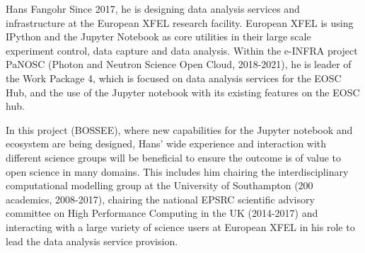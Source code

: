 \begin{participant}[type=leadPI,PM=4,gender=male]{Hans Fangohr}
  Since 2017, he is designing data analysis services and
  infrastructure at the European XFEL research facility. European XFEL
  is using IPython and the Jupyter Notebook as core utilities in their
  large scale experiment control, data capture and data
  analysis. Within the e-INFRA project PaNOSC (Photon and Neutron
  Science Open Cloud, 2018-2021), he is leader of the Work Package 4,
  which is focused on data analysis services for the EOSC Hub, and the
  use of the Jupyter notebook with its existing features on the EOSC
  hub.

  In this project (BOSSEE), where new capabilities for the Jupyter
  notebook and ecosystem are being designed, Hans' wide experience and
  interaction with different science groups will be beneficial to
  ensure the outcome is of value to open science in many domains. This
  includes him chairing the interdisciplinary computational modelling
  group at the University of Southampton (200 academics, 2008-2017),
  chairing the national EPSRC scientific advisory committee on High
  Performance Computing in the UK (2014-2017) and interacting with a
  large variety of science users at European XFEL in his role
  to lead the data analysis service provision.
\end{participant}

